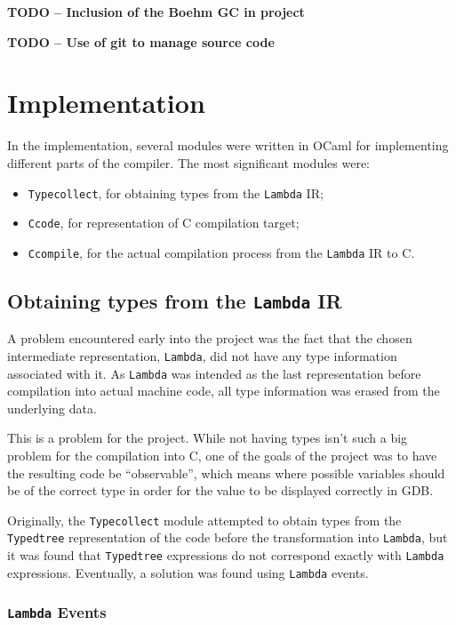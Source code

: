 \documentclass[12pt,a4paper,twoside,openright]{report}
\begin{document}
\textbf{TODO -- Inclusion of the Boehm GC in project}

\textbf{TODO -- Use of git to manage source code}

\chapter{Implementation}

In the implementation, several modules were written in OCaml 
for implementing different parts of the compiler. The most significant modules 
were:

\begin{itemize}
\item \texttt{Typecollect}, for obtaining types from the \texttt{Lambda} IR;
\item \texttt{Ccode}, for representation of C compilation target;
\item \texttt{Ccompile}, for the actual compilation process from the 
\texttt{Lambda} IR to C.
\end{itemize}

\section{Obtaining types from the \texttt{Lambda} IR} \label{lambda-types}

A problem encountered early into the project was the fact that the chosen 
intermediate representation, \texttt{Lambda}, did not have any type information 
associated with it. As \texttt{Lambda} was intended as the last representation 
before compilation into actual machine code, all type information was erased 
from the underlying data.

This is a problem for the project. While not having types isn't such a big 
problem for the compilation into C, one of the goals of the project was to have 
the resulting code be ``observable'', which means where possible variables 
should be of the correct type in order for the value to be displayed correctly 
in GDB.

Originally, the \texttt{Typecollect} module attempted to obtain types from the 
\texttt{Typedtree} representation of the code before the transformation into 
\texttt{Lambda}, but it was found that \texttt{Typedtree} expressions do not 
correspond exactly with \texttt{Lambda} expressions. Eventually, a solution was 
found using \texttt{Lambda} events.

\subsection{\texttt{Lambda} Events} \label{levents}
\end{document}
